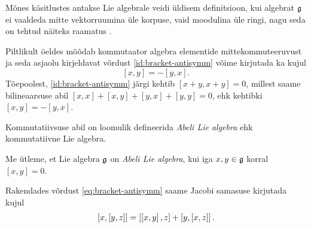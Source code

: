 \begin{markus}
    Mõnes käsitlustes antakse Lie algebrale veidi üldisem definitsioon,
    kui algebrat $\mathfrak{g}$ ei vaaldeda mitte vektorruumina üle korpuse,
    vaid moodulina üle ringi, nagu seda on tehtud näiteks raamatus
    \cite{bourbaki1989lie}.
\end{markus}

Piltlikult öeldes mõõdab kommutaator
algebra elementide mittekommuteeruvust ja seda asjaolu kirjeldavat võrdust
\eqref{id:bracket-antisymm} võime kirjutada ka kujul
\begin{equation}\label{eq:bracket-antisymm}
    [x, y] = -[y, x].
\end{equation}
Tõepoolest, \eqref{id:bracket-antisymm} järgi kehtib $[x+y, x+y] = 0$,
millest saame bilineaarsuse abil $[x, x] + [x, y] + [y, x] + [y, y] = 0$,
ehk kehtibki $[x, y] = -[y, x]$.

Kommutatiivsuse abil on loomulik defineerida \emph{Abeli Lie algebra} ehk
kommutatiivne Lie algebra.
\begin{dfn}
    Me ütleme, et Lie algebra $\mathfrak{g}$ on \emph{Abeli Lie algebra}, kui iga
    $x, y \in \mathfrak{g}$ korral $[x, y] = 0$.
\end{dfn}

Rakendades võrdust \eqref{eq:bracket-antisymm} saame Jacobi samasuse
kirjutada kujul
\begin{align}\label{id:jacobi-modified}
    \left[ x, \left[ y, z \right] \right] = \left[ \left[ x, y \right], z \right] + \left[ y, \left[ x, z \right] \right].
\end{align}

